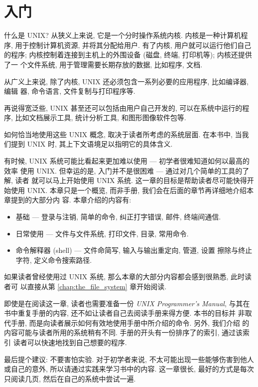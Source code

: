 \chapter{入门}
\label{chap:unix_for_beginners}

什么是 UNIX? 从狭义上来说, 它是一个分时操作系统内核. 内核是一种计算机程序,
用于控制计算机资源, 并将其分配给用户. 有了内核, 用户就可以运行他们自己的程序;
内核控制着连接到主机上的外围设备 (磁盘, 终端, 打印机等); 内核还提供了一
个文件系统, 用于管理需要长期存放的数据, 比如程序, 文档.

从广义上来说, 除了内核, UNIX 还必须包含一系列必要的应用程序, 比如编译器, 编辑
器, 命令语言, 文件复制与打印程序等.

再说得宽泛些, UNIX 甚至还可以包括由用户自己开发的, 可以在系统中运行的程序,
比如文档展示工具, 统计分析工具, 和图形图像软件包等.

如何恰当地使用这些 UNIX 概念, 取决于读者所考虑的系统层面. 在本书中, 当我们提到
UNIX 时, 其上下文语境足以指明它的具体含义.

有时候, UNIX 系统可能比看起来更加难以使用 --- 初学者很难知道如何以最高的效率
使用 UNIX. 但幸运的是, 入门并不是很困难 --- 通过对几个简单的工具的了解, 读者
就可以马上开始使用 UNIX 系统. 这一章的目标是帮助读者尽可能快得开始使用 UNIX.
本章只是一个概览, 而非手册, 我们会在后面的章节再详细地介绍本章提到的大部分内
容. 本章介绍的内容有:

\begin{itemize}
    \item 基础 --- 登录与注销, 简单的命令, 纠正打字错误, 邮件, 终端间通信.
    \item 日常使用 --- 文件与文件系统, 打印文件, 目录, 常用命令.
    \item 命令解释器 (shell) --- 文件命简写, 输入与输出重定向, 管道, 设置
        擦除与终止字符, 定义命令搜索路径.
\end{itemize}
  
如果读者曾经使用过 UNIX 系统, 那么本章的大部分内容都会感到很熟悉, 此时读者可
以直接从第 \ref{chap:the_file_system} 章开始阅读.

即使是在阅读这一章, 读者也需要准备一份 \textit{UNIX Programmer's Manual},
与其在书中重复手册的内容, 还不如让读者自己去阅读手册来得方便. 本书的目标并
非取代手册, 而是向读者展示如何有效地使用手册中所介绍的命令. 另外, 我们介绍
的内容可能与读者所用的系统稍有不同. 手册的开头有一份排序了的索引, 通过该索引
读者可以快速地找到自己想要的程序.

最后提个建议: 不要害怕实验. 对于初学者来说, 不太可能出现一些能够伤害到他人
或自己的意外, 所以请通过实践来学习书中的内容. 这一章很长, 最好的方式是每次
只阅读几页, 然后在自己的系统中尝试一遍.

